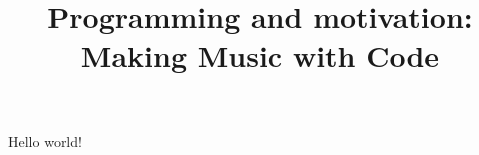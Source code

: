 \documentclass{article}
\title{Programming and motivation: Making Music with Code}
\author{}
\date{}
\begin{document}
\maketitle

\begin{abstract}
    
\end{abstract}



Hello world!


\end{document}
